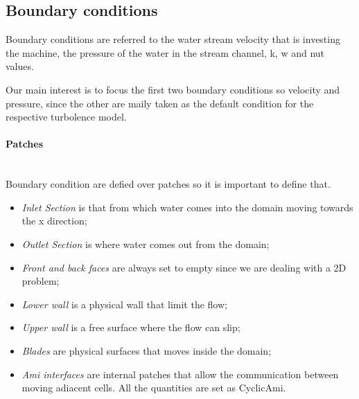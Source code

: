 \documentclass[a4paper,12pt]{article}
\begin{document}
\subsection{Boundary conditions}
Boundary conditions are referred to the water stream velocity that is investing the machine, the pressure of the water in the stream channel, k, w and nut values.

Our main interest is to focus the first two boundary conditions so velocity and pressure, since the other are maily taken as the default condition for the respective turbolence model.

\paragraph{Patches}\mbox{}\\
Boundary condition are defied over patches so it is important to define that.
\begin{itemize}
\item \emph{Inlet Section} is that from which water comes into the domain moving towards the x direction;
\item \emph{Outlet Section} is where water comes out from the domain;
\item \emph{Front and back faces} are always set to empty since we are dealing with a 2D problem;
\item \emph{Lower wall} is a physical wall that limit the flow;
\item \emph{Upper wall} is a free surface where the flow can slip;
\item \emph{Blades} are physical surfaces that moves inside the domain;
\item \emph{Ami interfaces} are internal patches that allow the communication between moving adiacent cells. All the quantities are set as CyclicAmi.
\end{itemize}
\end{document}
